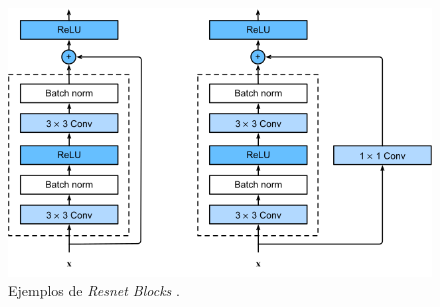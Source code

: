 \begin{figure}[H]
	\includegraphics[scale=0.35]{imagenes/03_Estado_del_arte/resnet-block.png}
	\centering
	\caption{Ejemplos de \textit{Resnet Blocks} \cite{resnetblocks}.}
	\label{fig:resnet}
\end{figure}
